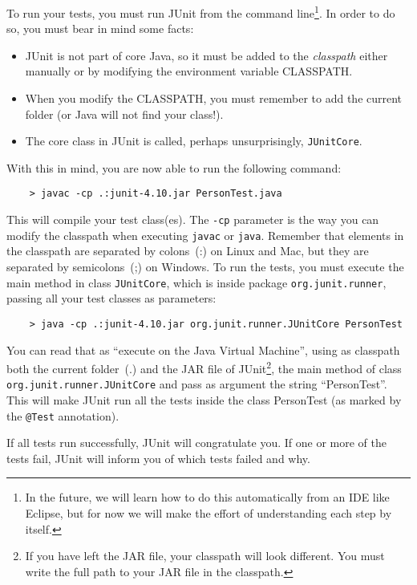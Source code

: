To run your tests, you must run JUnit from the command
line\footnote{In the future, we will learn how to do this
  automatically from an IDE like Eclipse, but for now we will make the
effort of understanding each step by itself.}. In order
to do so, you must bear in mind some facts: 

\begin{itemize}
\item JUnit is not part of core Java, so it must be added to the
  \emph{classpath} either manually or by modifying the environment
  variable CLASSPATH.
\item When you modify the CLASSPATH, you must remember to add the
  current folder (or Java will not find your class!).
\item The core class in JUnit is called, perhaps unsurprisingly,
  \verb+JUnitCore+. 
\end{itemize}

With this in mind, you are now able to run the following
command: 

\begin{verbatim}
    > javac -cp .:junit-4.10.jar PersonTest.java
\end{verbatim}

This will compile your test class(es). The \verb+-cp+ parameter is the
way you can modify the classpath when executing \verb+javac+ or
\verb+java+. Remember that elements in the classpath are separated by
colons~(:) on Linux and Mac, but they are separated by semicolons~(;) on
Windows. To run the tests, you must execute the main method in class
\verb+JUnitCore+, which is inside package \verb+org.junit.runner+,
passing all your test classes as parameters: 

\begin{verbatim}
    > java -cp .:junit-4.10.jar org.junit.runner.JUnitCore PersonTest
\end{verbatim}

You can read that as ``execute on the Java Virtual Machine'', using as
classpath both the current folder~(.) and the JAR file of
JUnit\footnote{If you have left the JAR file, your classpath will look
different. You must write the full path to your JAR file in the
classpath.}, the
main method of class \verb+org.junit.runner.JUnitCore+ and pass as
argument the string ``PersonTest''. This will make JUnit run all the
tests inside the class PersonTest (as marked by the \verb+@Test+
annotation). 

If all tests run successfully, JUnit will congratulate you. If one or
more of the tests fail, JUnit will inform you of which tests failed
and why. 

